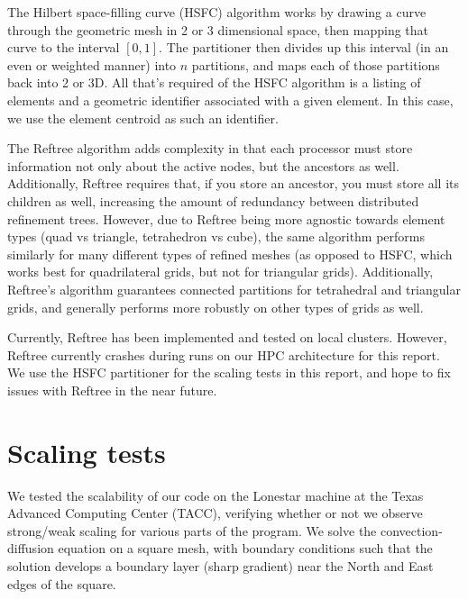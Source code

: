 \documentclass{article}
\begin{document}
The Hilbert space-filling curve (HSFC) algorithm works by drawing a curve through the geometric mesh in 2 or 3 dimensional space, then mapping that curve to the interval $[0,1]$. The partitioner then divides up this interval (in an even or weighted manner) into $n$ partitions, and maps each of those partitions back into 2 or 3D. All that's required of the HSFC algorithm is a listing of elements and a geometric identifier associated with a given element. In this case, we use the element centroid as such an identifier. 

The Reftree algorithm \cite{REFTREE} adds complexity in that each processor must store information not only about the active nodes, but the ancestors as well. Additionally, Reftree requires that, if you store an ancestor, you must store all its children as well, increasing the amount of redundancy between distributed refinement trees. However, due to Reftree being more agnostic towards element types (quad vs triangle, tetrahedron vs cube), the same algorithm performs similarly for many different types of refined meshes (as opposed to HSFC, which works best for quadrilateral grids, but not for triangular grids).  Additionally, Reftree's algorithm guarantees connected partitions for tetrahedral and triangular grids, and generally performs more robustly on other types of grids as well.  

Currently, Reftree has been implemented and tested on local clusters. However, Reftree currently crashes during runs on our HPC architecture for this report. We use the HSFC partitioner for the scaling tests in this report, and hope to fix issues with Reftree in the near future. 

\section{Scaling tests}\label{sec:NumericalExperiments}

We tested the scalability of our code on the Lonestar machine at the Texas Advanced Computing Center (TACC), verifying whether or not we observe strong/weak scaling for various parts of the program.  We solve the convection-diffusion equation on a square mesh, with boundary conditions such that the solution develops a boundary layer (sharp gradient) near the North and East edges of the square.  
\end{document}
